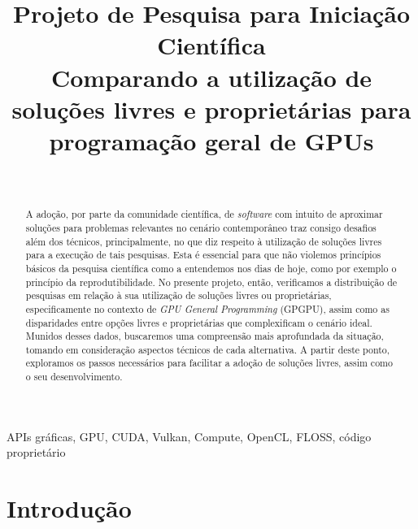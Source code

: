 \documentclass[10pt, a4paper, conference, onecolumn]{IEEEtran}
\begin{document}
\title{\textbf{Projeto de Pesquisa para Iniciação Científica} \\
{Comparando a utilização de soluções livres e proprietárias para programação geral de GPUs}
}

\author{ \\
\and
{}
}

\maketitle

\begin{abstract}
    A adoção, por parte da comunidade científica, de \textit{software} com
    intuito de aproximar soluções para problemas relevantes no cenário
    contemporâneo traz consigo desafios além dos técnicos, principalmente, no
    que diz respeito à utilização de soluções livres para a execução de tais
    pesquisas.
    Esta é essencial para que não violemos princípios básicos da pesquisa
    científica como a entendemos nos dias de hoje, como por exemplo o princípio
    da reprodutibilidade.
    No presente projeto, então, verificamos a distribuição de pesquisas em
    relação à sua utilização de soluções livres ou proprietárias,
    especificamente no contexto de \textit{GPU General Programming} (GPGPU),
    assim como as disparidades entre opções livres e proprietárias que
    complexificam o cenário ideal.
    Munidos desses dados, buscaremos uma compreensão mais aprofundada da
    situação, tomando em consideração aspectos técnicos de cada alternativa.
    A partir deste ponto, exploramos os passos necessários para facilitar a
    adoção de soluções livres, assim como o seu desenvolvimento.
\end{abstract}

\begin{IEEEkeywords}
    APIs gráficas, GPU, CUDA, Vulkan, Compute, OpenCL, FLOSS, código proprietário
\end{IEEEkeywords}

\section{Introdução}
\end{document}
